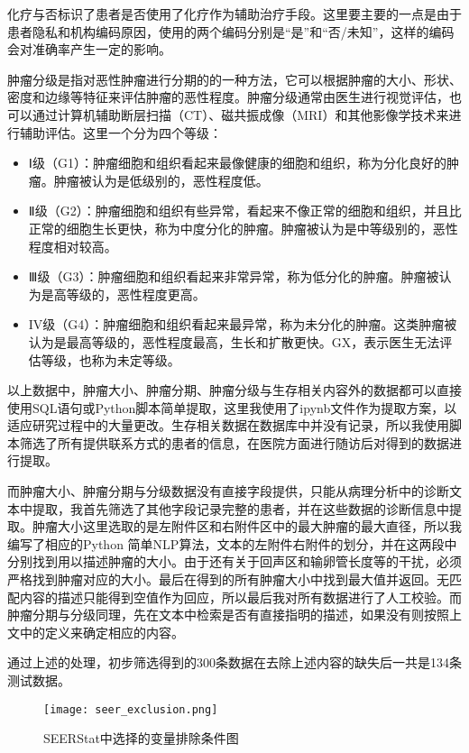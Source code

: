 化疗与否标识了患者是否使用了化疗作为辅助治疗手段。这里要主要的一点是由于患者隐私和机构编码原因，使用的两个编码分别是“是”和“否/未知”，这样的编码会对准确率产生一定的影响。

肿瘤分级是指对恶性肿瘤进行分期的的一种方法，它可以根据肿瘤的大小、形状、密度和边缘等特征来评估肿瘤的恶性程度。肿瘤分级通常由医生进行视觉评估，也可以通过计算机辅助断层扫描（CT）、磁共振成像（MRI）和其他影像学技术来进行辅助评估。这里一个分为四个等级：

\begin{itemize}
\item Ⅰ级（G1）：肿瘤细胞和组织看起来最像健康的细胞和组织，称为分化良好的肿瘤。肿瘤被认为是低级别的，恶性程度低。
\item Ⅱ级（G2）：肿瘤细胞和组织有些异常，看起来不像正常的细胞和组织，并且比正常的细胞生长更快，称为中度分化的肿瘤。肿瘤被认为是中等级别的，恶性程度相对较高。
\item Ⅲ级（G3）：肿瘤细胞和组织看起来非常异常，称为低分化的肿瘤。肿瘤被认为是高等级的，恶性程度更高。
\item IV级（G4）：肿瘤细胞和组织看起来最异常，称为未分化的肿瘤。这类肿瘤被认为是最高等级的，恶性程度最高，生长和扩散更快。GX，表示医生无法评估等级，也称为未定等级。
\end{itemize}

以上数据中，肿瘤大小、肿瘤分期、肿瘤分级与生存相关内容外的数据都可以直接使用SQL语句或Python脚本简单提取，这里我使用了ipynb文件作为提取方案，以适应研究过程中的大量更改。生存相关数据在数据库中并没有记录，所以我使用脚本筛选了所有提供联系方式的患者的信息，在医院方面进行随访后对得到的数据进行提取。

而肿瘤大小、肿瘤分期与分级数据没有直接字段提供，只能从病理分析中的诊断文本中提取，我首先筛选了其他字段记录完整的患者，并在这些数据的诊断信息中提取。肿瘤大小这里选取的是左附件区和右附件区中的最大肿瘤的最大直径，所以我编写了相应的Python 简单NLP算法，文本的左附件右附件的划分，并在这两段中分别找到用以描述肿瘤的大小。由于还有关于回声区和输卵管长度等的干扰，必须严格找到肿瘤对应的大小。最后在得到的所有肿瘤大小中找到最大值并返回。无匹配内容的描述只能得到空值作为回应，所以最后我对所有数据进行了人工校验。而肿瘤分期与分级同理，先在文本中检索是否有直接指明的描述，如果没有则按照上文中的定义来确定相应的内容。

通过上述的处理，初步筛选得到的300条数据在去除上述内容的缺失后一共是134条测试数据。

\begin{figure}[!htbp]
    \centering
    \texttt{[image: seer\_exclusion.png]}
    \caption{SEERStat中选择的变量排除条件图} \label{fig:seer_exclusion}
\end{figure}
